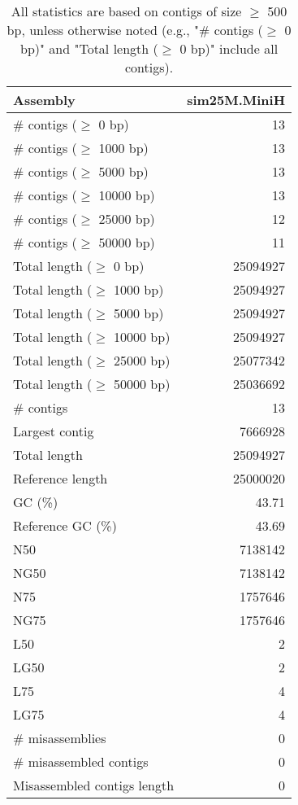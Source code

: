 \documentclass[12pt,a4paper]{article}
\begin{document}
\begin{table}[ht]
\begin{center}
\caption{All statistics are based on contigs of size $\geq$ 500 bp, unless otherwise noted (e.g., "\# contigs ($\geq$ 0 bp)" and "Total length ($\geq$ 0 bp)" include all contigs).}
\begin{tabular}{|l*{1}{|r}|}
\hline
Assembly & sim25M.MiniH \\ \hline
\# contigs ($\geq$ 0 bp) & 13 \\ \hline
\# contigs ($\geq$ 1000 bp) & 13 \\ \hline
\# contigs ($\geq$ 5000 bp) & 13 \\ \hline
\# contigs ($\geq$ 10000 bp) & 13 \\ \hline
\# contigs ($\geq$ 25000 bp) & 12 \\ \hline
\# contigs ($\geq$ 50000 bp) & 11 \\ \hline
Total length ($\geq$ 0 bp) & 25094927 \\ \hline
Total length ($\geq$ 1000 bp) & 25094927 \\ \hline
Total length ($\geq$ 5000 bp) & 25094927 \\ \hline
Total length ($\geq$ 10000 bp) & 25094927 \\ \hline
Total length ($\geq$ 25000 bp) & 25077342 \\ \hline
Total length ($\geq$ 50000 bp) & 25036692 \\ \hline
\# contigs & 13 \\ \hline
Largest contig & 7666928 \\ \hline
Total length & 25094927 \\ \hline
Reference length & 25000020 \\ \hline
GC (\%) & 43.71 \\ \hline
Reference GC (\%) & 43.69 \\ \hline
N50 & 7138142 \\ \hline
NG50 & 7138142 \\ \hline
N75 & 1757646 \\ \hline
NG75 & 1757646 \\ \hline
L50 & 2 \\ \hline
LG50 & 2 \\ \hline
L75 & 4 \\ \hline
LG75 & 4 \\ \hline
\# misassemblies & 0 \\ \hline
\# misassembled contigs & 0 \\ \hline
Misassembled contigs length & 0 \\ \hline

\end{tabular}
\end{center}
\end{table}
\end{document}
